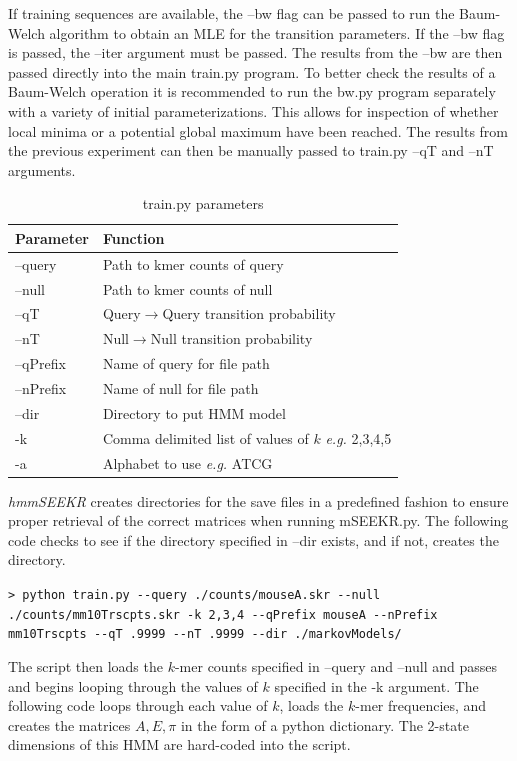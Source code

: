 If training sequences are available, the --bw flag can be passed to run the Baum-Welch algorithm to obtain an MLE for the transition parameters. If the --bw flag is passed, the --iter argument must be passed. The results from the --bw are then passed directly into the main train.py program. To better check the results of a Baum-Welch operation it is recommended to run the bw.py program separately with a variety of initial parameterizations. This allows for inspection of whether local minima or a potential global maximum have been reached. The results from the previous experiment can then be manually passed to train.py --qT and --nT arguments.
\begin{table}[h]
\centering
 \begin{tabular}{|l l|}
 \hline
 Parameter & Function\\
 \hline
 --query & Path to kmer counts of query \\
 --null & Path to kmer counts of null \\
 --qT & Query$\rightarrow$Query transition probability \\
 --nT & Null$\rightarrow$Null transition probability \\
 --qPrefix & Name of query for file path \\
 --nPrefix & Name of null for file path\\
 --dir & Directory to put HMM model \\
 -k & Comma delimited list of values of $k$ \emph{e.g.} 2,3,4,5\\
 -a & Alphabet to use \emph{e.g.} ATCG\\
 \hline
 
\end{tabular}
\caption{train.py parameters}
\label{tab:trainparams}
\end{table}
\linebreak

\emph{hmmSEEKR} creates directories for the save files in a predefined fashion to ensure proper retrieval of the correct matrices when running mSEEKR.py. The following code checks to see if the directory specified in --dir exists, and if not, creates the directory. 

\lstinline{> python train.py --query ./counts/mouseA.skr --null ./counts/mm10Trscpts.skr -k 2,3,4 --qPrefix mouseA --nPrefix mm10Trscpts --qT .9999 --nT .9999 --dir ./markovModels/}


The script then loads the $k$-mer counts specified in --query and --null and passes and begins looping through the values of $k$ specified in the -k argument. The following code loops through each value of $k$, loads the $k$-mer frequencies, and creates the matrices $A,E,\pi$ in the form of a python dictionary. The 2-state dimensions of this HMM are hard-coded into the script. 


